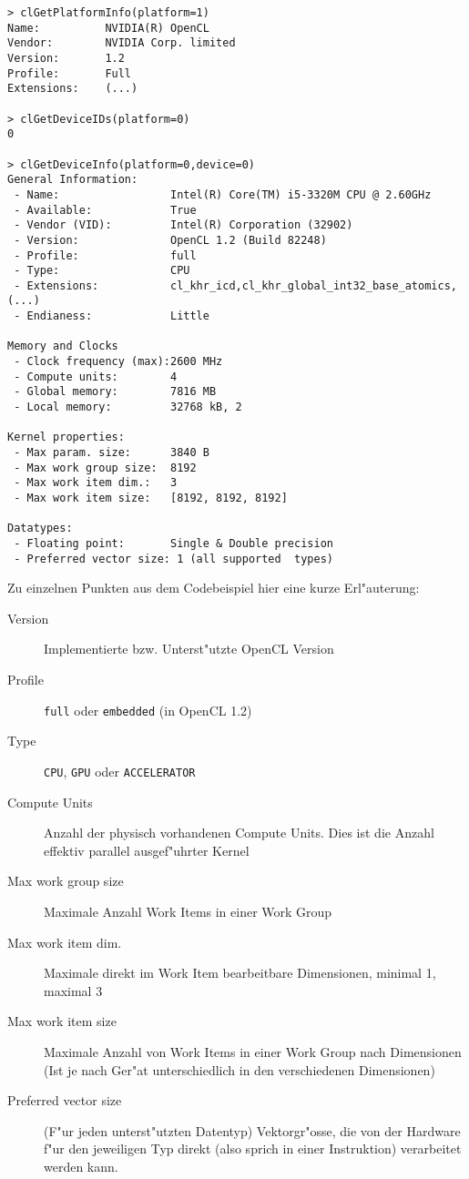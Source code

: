\begin{refsection}
\begin{small}
\begin{verbatim}
> clGetPlatformInfo(platform=1)
Name:          NVIDIA(R) OpenCL
Vendor:        NVIDIA Corp. limited
Version:       1.2
Profile:       Full
Extensions:    (...)

> clGetDeviceIDs(platform=0)
0

> clGetDeviceInfo(platform=0,device=0)
General Information:
 - Name:                 Intel(R) Core(TM) i5-3320M CPU @ 2.60GHz
 - Available:            True
 - Vendor (VID):         Intel(R) Corporation (32902)
 - Version:              OpenCL 1.2 (Build 82248)
 - Profile:              full
 - Type:                 CPU 
 - Extensions:           cl_khr_icd,cl_khr_global_int32_base_atomics,(...)
 - Endianess:            Little

Memory and Clocks
 - Clock frequency (max):2600 MHz
 - Compute units:        4
 - Global memory:        7816 MB
 - Local memory:         32768 kB, 2

Kernel properties:
 - Max param. size:      3840 B
 - Max work group size:  8192
 - Max work item dim.:   3
 - Max work item size:   [8192, 8192, 8192]

Datatypes:
 - Floating point:       Single & Double precision
 - Preferred vector size: 1 (all supported  types)
\end{verbatim}
\end{small}

\vspace{1em}

\noindent Zu einzelnen Punkten aus dem Codebeispiel hier eine kurze Erl"auterung:


\begin{description}
 \item [Version] Implementierte bzw. Unterst"utzte OpenCL Version
 \item [Profile] \texttt{full} oder \texttt{embedded} (in OpenCL 1.2)
 \item [Type]    \texttt{CPU}, \texttt{GPU} oder \texttt{ACCELERATOR}
 \item [Compute Units] Anzahl der physisch vorhandenen Compute Units. Dies ist
                 die Anzahl effektiv parallel ausgef"uhrter Kernel
 \item [Max work group size] Maximale Anzahl Work Items in einer Work Group
 \item [Max work item dim.] Maximale direkt im Work Item bearbeitbare Dimensionen, minimal 1, maximal 3
 \item [Max work item size] Maximale Anzahl von Work Items in einer Work Group nach
                 Dimensionen (Ist je nach Ger"at unterschiedlich in den verschiedenen
                 Dimensionen)
 \item [Preferred vector size] (F"ur jeden unterst"utzten Datentyp) Vektorgr"osse, 
                 die von der Hardware f"ur den jeweiligen Typ direkt (also sprich in einer 
                 Instruktion) verarbeitet werden kann.
 

\end{description}
\end{refsection}

